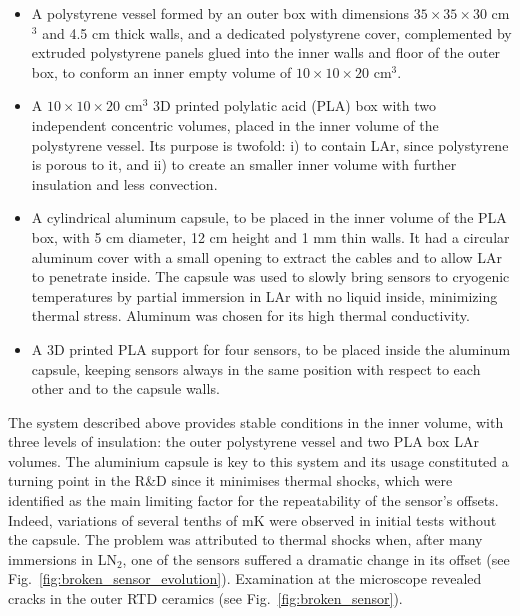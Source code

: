 \begin{itemize}
    \item A polystyrene vessel formed by an outer box with dimensions $35\times35\times30$ cm$^3$ and 4.5 cm thick walls, and a dedicated polystyrene cover, complemented by extruded polystyrene panels glued into the inner walls and floor of the outer box, to conform an inner empty volume of $10\times10\times20$ cm$^3$. 
    \item A $10\times10\times20$ cm$^3$ 3D printed polylatic acid (PLA) box with two independent concentric volumes, placed in the inner volume of the polystyrene vessel. Its purpose is twofold: i) to contain LAr, since polystyrene is porous to it, and ii) to create an smaller inner volume  with further insulation and less convection.  
    \item A cylindrical aluminum capsule, to be placed in the inner volume of the PLA box,  with 5 cm diameter, 12 cm height and 1 mm thin walls. It had a circular aluminum cover with a small opening to extract the cables and to allow LAr to penetrate inside. The capsule was used to slowly bring sensors to cryogenic temperatures by partial immersion in LAr with no liquid inside, minimizing thermal stress. Aluminum was chosen for its high thermal conductivity.      
    \item  A 3D printed PLA support for four sensors, to be placed inside the aluminum capsule, keeping sensors always in the same position with respect to each other and to the capsule walls. 
\end{itemize}

The system described above provides stable conditions in the inner volume, with three levels of insulation: the outer polystyrene vessel and two PLA box LAr volumes. The aluminium capsule is key to this system and its usage constituted a turning point in the R\&D since it minimises thermal shocks, which were identified as the main limiting factor for the repeatability of the sensor's offsets. Indeed, variations of several tenths of mK were observed in initial tests without the capsule. The problem was attributed to thermal shocks when, after many immersions in LN$_{2}$, one of the sensors suffered a dramatic change in its offset (see Fig.~\ref{fig:broken_sensor_evolution}). Examination at the microscope revealed cracks in the outer RTD ceramics (see Fig.~\ref{fig:broken_sensor}). 

